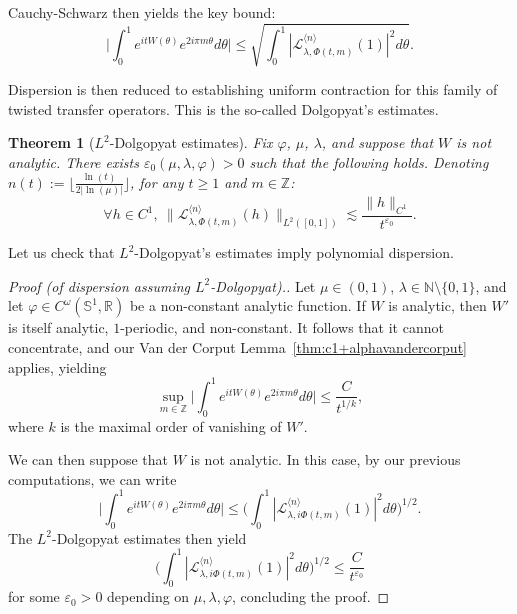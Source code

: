 \documentclass[11pt]{amsart}
\theoremstyle{plain}
\newtheorem{theorem}{Theorem}[section]
\theoremstyle{definition}
\numberwithin{equation}{section}
\begin{document}
Cauchy-Schwarz then yields the key bound:
$$ \Big| \int_0^1 e^{i t W(\theta)} e^{2 i \pi m \theta} d\theta \Big| \leq \sqrt{\int_0^1 |\mathcal{L}_{\lambda,\Phi(t,m)}^{\langle n \rangle}(1)|^2 d\theta}. $$

Dispersion is then reduced to establishing uniform contraction for this family of twisted transfer operators. This is the so-called Dolgopyat's estimates.

\begin{theorem}[$L^2$-Dolgopyat estimates]
Fix $\varphi$, $\mu$, $\lambda$, and suppose that $W$ is not analytic. There exists $\varepsilon_0(\mu,\lambda,\varphi)>0$ such that the following holds. Denoting $n(t) := \lfloor  \frac{\ln(t)}{2|\ln(\mu)|} \rfloor$, for any $t\geq 1$ and $m \in \mathbb{Z}$:
$$ \forall h \in C^1, \ \Big\| \mathcal{L}_{\lambda,\Phi(t,m)}^{\langle n \rangle}(h) \Big\|_{L^2([0,1])} \lesssim \frac{\|h\|_{C^1}}{ t^{\varepsilon_0}} .$$
\end{theorem}

Let us check that $L^2$-Dolgopyat's estimates imply polynomial dispersion.

\begin{proof}[Proof (of dispersion assuming $L^2$-Dolgopyat).]
Let $\mu \in (0,1)$, $\lambda \in \mathbb{N} \setminus \{0,1\}$, and let $\varphi \in C^\omega(\mathbb{S}^1,\mathbb{R})$ be a non-constant analytic function. If $W$ is analytic, then $W'$ is itself analytic, $1$-periodic, and non-constant. It follows that it cannot concentrate, and our Van der Corput Lemma~\ref{thm:c1+alphavandercorput} applies, yielding
$$ \sup_{m \in \mathbb{Z}} \Big| \int_0^1 e^{ i t W(\theta)} e^{2 i \pi m \theta} d\theta \Big| \leq \frac{C}{t^{1/k}}, $$
where $k$ is the maximal order of vanishing of $W'$.

We can then suppose that $W$ is not analytic. In this case, by our previous computations, we can write
$$ \Big| \int_0^1 e^{ i t W(\theta)} e^{2 i \pi m \theta} d\theta \Big| \leq \Big(\int_0^1 |\mathcal{L}_{\lambda,i\Phi(t,m)}^{\langle n \rangle}(1)|^2 d\theta\Big)^{1/2}. $$
The $L^2$-Dolgopyat estimates then yield
$$ \Big(\int_0^1 |\mathcal{L}_{\lambda,i\Phi(t,m)}^{\langle n \rangle}(1)|^2 d\theta\Big)^{1/2} \leq \frac{C}{t^{\varepsilon_0}} $$
for some $\varepsilon_0>0$ depending on $\mu,\lambda,\varphi$, concluding the proof.
\end{proof}
\end{document}
